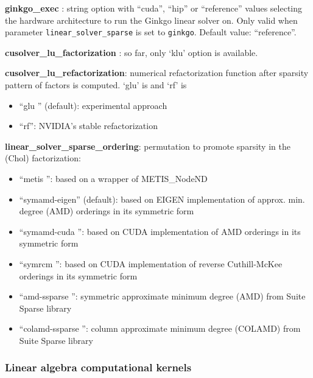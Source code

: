\noindent \textbf{ginkgo\_exec }: string option with ``cuda'', ``hip'' or ``reference'' values selecting the hardware architecture to run the Ginkgo linear solver on. Only valid when parameter \texttt{linear\_solver\_sparse} is set to \texttt{ginkgo}. Default value: ``reference''.
\medskip

\noindent \textbf{cusolver\_lu\_factorization }: so far, only `klu' option is available.
\medskip

\noindent \textbf{cusolver\_lu\_refactorization}: numerical refactorization function after sparsity pattern of factors is computed. `glu' is  and `rf' is 
\begin{itemize}
\item ``glu '' (default): experimental approach
\item ``rf'': NVIDIA's stable refactorization
\end{itemize}
\medskip

\noindent \textbf{linear\_solver\_sparse\_ordering}: permutation to promote sparsity in the (Chol) factorization:
\begin{itemize}
\item ``metis '': based on a wrapper of METIS\_NodeND
\item ``symamd-eigen'' (default): based on EIGEN implementation of approx. min. degree (AMD) orderings in its symmetric form
\item ``symamd-cuda '': based on CUDA implementation of AMD orderings in its symmetric form
\item ``symrcm '': based on CUDA implementation of reverse Cuthill-McKee orderings in its symmetric form
\item ``amd-ssparse '': symmetric approximate minimum degree (AMD) from Suite Sparse library
\item ``colamd-ssparse '': column approximate minimum degree (COLAMD) from Suite Sparse library
\end{itemize}
\medskip



\subsubsection{Linear algebra computational kernels}


